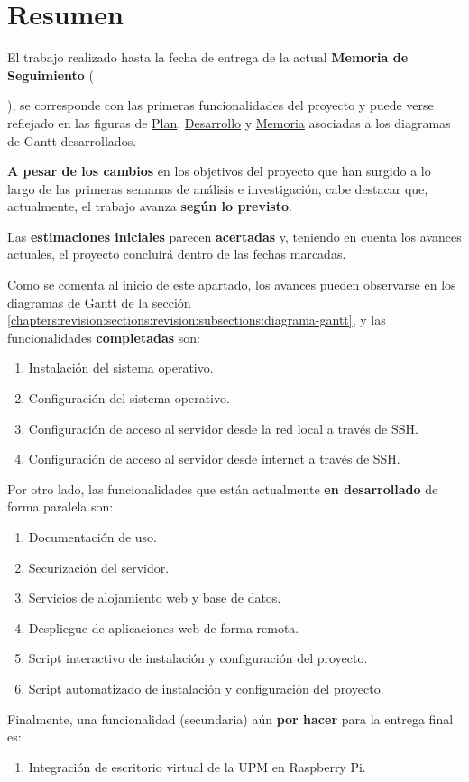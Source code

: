 \section{Resumen} \label{chapters:resumen:sections:resumen}

El trabajo realizado hasta la fecha de entrega de la actual \textbf{Memoria de Seguimiento} (\date{24 de abril de 2022}), se corresponde con las primeras funcionalidades del proyecto y puede verse reflejado en las figuras de \hyperref[chapters:revision:sections:revision:subsections:diagrama-gantt:figure:plan]{Plan}, \hyperref[chapters:revision:sections:revision:subsections:diagrama-gantt:figure:desarrollo]{Desarrollo} y \hyperref[chapters:revision:sections:revision:subsections:diagrama-gantt:figure:memoria]{Memoria} asociadas a los diagramas de Gantt desarrollados.

\textbf{A pesar de los cambios} en los objetivos del proyecto que han surgido a lo largo de las primeras semanas de análisis e investigación, cabe destacar que, actualmente, el trabajo avanza \textbf{según lo previsto}.

Las \textbf{estimaciones iniciales} parecen \textbf{acertadas} y, teniendo en cuenta los avances actuales, el proyecto concluirá dentro de las fechas marcadas.

Como se comenta al inicio de este apartado, los avances pueden observarse en los diagramas de Gantt de la sección \ref{chapters:revision:sections:revision:subsections:diagrama-gantt}, y las funcionalidades \textbf{completadas} son:

\begin{enumerate}[itemsep=0em]
    \item Instalación del sistema operativo.
    \item Configuración del sistema operativo.
    \item Configuración de acceso al servidor desde la red local a través de SSH.
    \item Configuración de acceso al servidor desde internet a través de SSH.
\end{enumerate}

Por otro lado, las funcionalidades que están actualmente \textbf{en desarrollado} de forma paralela son:

\begin{enumerate}[itemsep=0em]
    \item Documentación de uso.
    \item Securización del servidor.
    \item Servicios de alojamiento web y base de datos.
    \item Despliegue de aplicaciones web de forma remota.
    \item Script interactivo de instalación y configuración del proyecto.
    \item Script automatizado de instalación y configuración del proyecto.
\end{enumerate}


Finalmente, una funcionalidad (secundaria) aún \textbf{por hacer} para la entrega final es:

\begin{enumerate}[itemsep=0em]
    \item Integración de escritorio virtual de la UPM en Raspberry Pi.
\end{enumerate}


\clearpage
